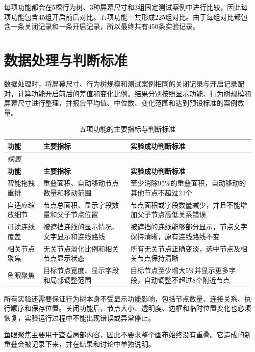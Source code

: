 \documentclass[11pt,a4paper,oneside,extrafontsizes]{memoir}
\begin{document}
每项功能都会在5棵行为树、3种屏幕尺寸和3组固定测试案例中进行比较，因此每项功能包含45组开启前后对比。五项功能一共形成225组对比。由于每组对比都包含一条关闭记录和一条开启记录，所以最终共有450条实验记录。

\section{数据处理与判断标准}

数据处理时，将屏幕尺寸、行为树规模和测试案例相同的关闭记录与开启记录配对，计算功能开启前后的差值和变化比例。结果分别按照显示功能、行为树规模和屏幕尺寸进行整理，并报告平均值、中位数、变化范围和达到预设标准的案例数量。

\begin{center}
\small
\begin{longtable}{@{}p{} p{} p{}@{}}
\caption{五项功能的主要指标与判断标准}\label{tab:auto-4}\\
\toprule
\textbf{功能} & \textbf{主要指标} & \textbf{实验成功判断标准} \\
\midrule
\endfirsthead
\multicolumn{3}{l}{\small\itshape 续表}\\
\toprule
\textbf{功能} & \textbf{主要指标} & \textbf{实验成功判断标准} \\
\midrule
\endhead
智能拖拽重排 & 重叠面积、自动移动节点数量和移动范围 & 至少消除95\%的重叠面积，自动移动的其他节点不超过24个 \\
自适应缩放细节 & 节点总面积、显示字段数量和父子节点位置 & 节点面积或字段数量减少，并且不能增加父子节点高低关系错误 \\
可读连线覆盖 & 被遮挡连线的显示情况、文字显示和连线路线 & 被遮挡的连线能够部分显示，节点文字保持清晰，原有连线路线不变 \\
相关节点聚焦 & 无关节点淡化比例和相关节点显示状态 & 所有无关节点正确变淡，选中节点及相关节点保持清晰 \\
鱼眼聚焦 & 目标节点宽度、显示字段和局部调整范围 & 目标节点至少增大5\%并显示更多字段，自动调整不超过8个附近节点 \\
\bottomrule
\end{longtable}
\end{center}

所有实验还需要保证行为树本身不受显示功能影响，包括节点数量、连接关系、执行顺序和保存位置。关闭功能后，节点大小、透明度、边框和临时位置变化也必须恢复，实验运行过程中不能出现错误或异常停止。

鱼眼聚焦主要用于查看局部内容，因此不要求整个画布始终没有重叠。它造成的新重叠会被记录下来，并在结果和讨论中单独说明。
\end{document}
